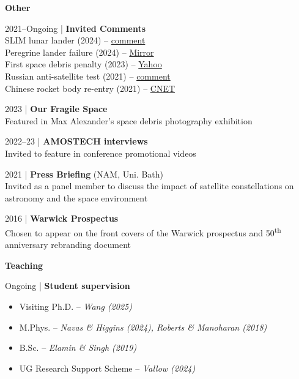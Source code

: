 \documentclass[10pt,a4paper]{altacv}
\begin{document}
\divider

\normalsize \textbf{Other}

\medskip

\small 2021--Ongoing | \textbf{Invited Comments} \\

SLIM lunar lander (2024) -- \href{https://warwick.ac.uk/newsandevents/expertcomment/?newsItem=8a1785d78ce92907018d1d1823594aac}{comment} \\ 
Peregrine lander failure (2024) -- \href{https://www.mirror.co.uk/news/us-news/expert-risks-peregrine-spacecraft-tumbling-31849818}{Mirror} \\
First space debris penalty (2023) -- \href{https://uk.news.yahoo.com/dish-network-us-government-issues-113326233.html}{Yahoo} \\
Russian anti-satellite test (2021) -- \href{https://warwick.ac.uk/newsandevents/expertcomment/russian_anti-satellite_missile}{comment} \\
Chinese rocket body re-entry (2021) -- \href{https://www.cnet.com/science/debris-from-out-of-control-chinese-rocket-crashes-back-to-earth-over-indian-ocean/}{CNET}

\smallskip

\small 2023 | \textbf{Our Fragile Space} \\
Featured in Max Alexander's space debris photography exhibition

\smallskip

\small 2022--23 | \textbf{AMOSTECH interviews} \\
Invited to feature in conference promotional videos

\smallskip

\small 2021 | \textbf{Press Briefing} (NAM, Uni. Bath) \\
Invited as a panel member to discuss the impact of satellite constellations on astronomy and the space environment

\smallskip

\small 2016 | \textbf{Warwick Prospectus} \\
Chosen to appear on the front covers of the Warwick prospectus and 50\textsuperscript{th} anniversary rebranding document

\medskip


\normalsize \textbf{Teaching}

\medskip

\small Ongoing | \textbf{Student supervision} \\
\smallskip
\begin{itemize}
	\item Visiting Ph.D. -- \textit{Wang (2025)} %
	\item M.Phys. -- \textit{Navas \& Higgins (2024), Roberts \& Manoharan (2018)} %
	\item B.Sc. -- \textit{Elamin \& Singh (2019)} %
	\item UG Research Support Scheme -- \textit{Vallow (2024)} %
\end{itemize}
\end{document}
